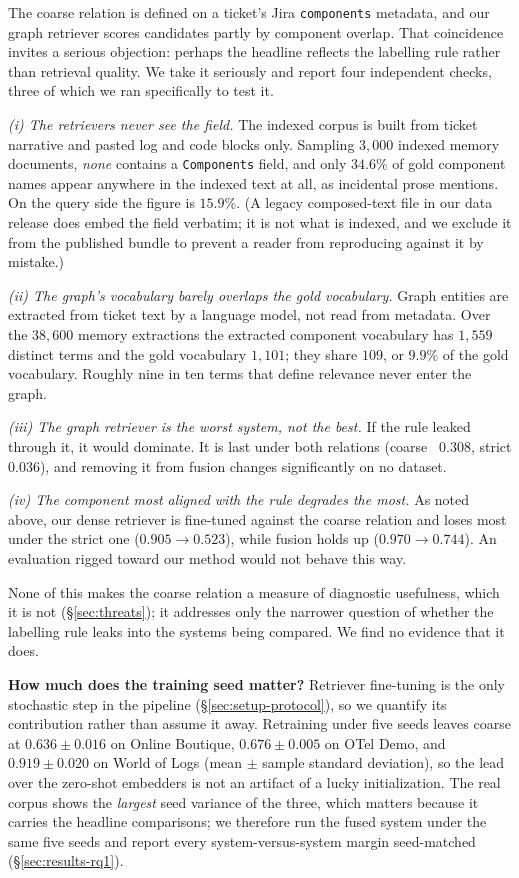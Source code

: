 The coarse relation is defined on a ticket's Jira \texttt{components} metadata,
and our graph retriever scores candidates partly by component overlap. That
coincidence invites a serious objection: perhaps the headline reflects the
labelling rule rather than retrieval quality. We take it seriously and report
four independent checks, three of which we ran specifically to test it.

\emph{(i) The retrievers never see the field.} The indexed corpus is built from
ticket narrative and pasted log and code blocks only. Sampling $3{,}000$ indexed
memory documents, \emph{none} contains a \texttt{Components} field, and only
$34.6\%$ of gold component names appear anywhere in the indexed text at all, as
incidental prose mentions. On the query side the figure is $15.9\%$. (A legacy
composed-text file in our data release does embed the field verbatim; it is not
what is indexed, and we exclude it from the published bundle to prevent a reader
from reproducing against it by mistake.)

\emph{(ii) The graph's vocabulary barely overlaps the gold vocabulary.} Graph
entities are extracted from ticket text by a language model, not read from
metadata. Over the $38{,}600$ memory extractions the extracted component
vocabulary has $1{,}559$ distinct terms and the gold vocabulary $1{,}101$; they
share $109$, or $9.9\%$ of the gold vocabulary. Roughly nine in ten terms that
define relevance never enter the graph.

\emph{(iii) The graph retriever is the worst system, not the best.} If the rule
leaked through it, it would dominate. It is last under both relations (coarse
~$0.308$, strict $0.036$), and removing it from fusion changes 
significantly on no dataset.

\emph{(iv) The component most aligned with the rule degrades the most.} As noted
above, our dense retriever is fine-tuned against the coarse relation and loses
most under the strict one ($0.905\!\rightarrow\!0.523$), while fusion holds up
($0.970\!\rightarrow\!0.744$). An evaluation rigged toward our method would not
behave this way.

None of this makes the coarse relation a measure of diagnostic usefulness, which
it is not (\S\ref{sec:threats}); it addresses only the narrower question of
whether the labelling rule leaks into the systems being compared. We find no
evidence that it does.

\smallskip
\label{sec:results-seeds}
\noindent\textbf{How much does the training seed matter?} Retriever fine-tuning
is the only stochastic step in the pipeline (\S\ref{sec:setup-protocol}), so we
quantify its contribution rather than assume it away. Retraining under five
seeds leaves coarse  at $0.636\pm0.016$ on Online Boutique,
$0.676\pm0.005$ on OTel Demo, and $0.919\pm0.020$ on World of Logs (mean $\pm$
sample standard deviation), so the lead over the zero-shot embedders is not an
artifact of a lucky initialization. The real corpus shows the \emph{largest}
seed variance of the three, which matters because it carries the headline
comparisons; we therefore run the fused system under the same five seeds and
report every system-versus-system margin seed-matched
(\S\ref{sec:results-rq1}).

